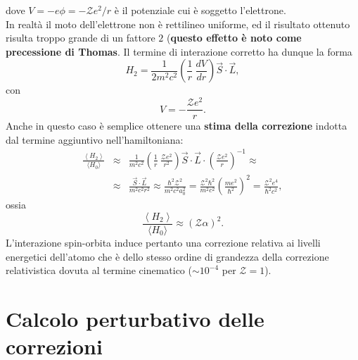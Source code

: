 \documentclass[a4paper,12pt,oneside]{book}
\begin{document}
dove $V=-e\phi=-\mathcal{Z}e^2/r$ è il potenziale cui è soggetto l'elettrone. \\
In realtà il moto dell'elettrone non è rettilineo uniforme, ed il risultato ottenuto risulta troppo grande di un fattore $2$ (\textbf{questo effetto è noto come precessione di Thomas}. Il termine di interazione corretto ha dunque la forma
\begin{equation} \label{eq:cap25_3}
H_2=\frac{1}{2m^2c^2} \left( \frac{1}{r} \ \frac{dV}{dr} \right) \vec{S} \cdot \vec{L} ,
\end{equation}
con
\begin{equation} 
V=-\frac{\mathcal{Z}e^2}{r} .
\end{equation}
Anche in questo caso è semplice ottenere una \textbf{stima della correzione} indotta dal termine aggiuntivo nell'hamiltoniana:
\begin{eqnarray}
\frac{\left< H_2 \right>}{\langle H_0 \rangle} & \approx & \frac{1}{m^2c^2} \left( \frac{1}{r} \ \frac{\mathcal{Z}e^2}{r^2} \right) \vec{S} \cdot \vec{L} \cdot \left( \frac{\mathcal{Z}e^2}{r} \right)^{-1} \approx \nonumber  \\
& \approx &\frac{\vec{S} \cdot \vec{L}}{m^2c^2r^2} \approx  \frac{\hbar^2 \mathcal{Z}^2}{m^2c^2a_0^2}=  \frac{\mathcal{Z}^2 \hbar^2}{m^2c^2}\left( \frac{me^2}{\hbar^2} \right)^2= \frac{\mathcal{Z}^2e^4}{\hbar^2c^2} ,
\end{eqnarray}
ossia
\begin{equation} 
\frac{\left< H_2 \right>}{\langle H_0 \rangle} \approx \left( \mathcal{Z}\alpha \right)^2 .
\end{equation}
L'interazione spin-orbita induce pertanto una correzione relativa ai livelli energetici dell'atomo che è dello stesso ordine di grandezza della correzione relativistica dovuta al termine cinematico ($\sim10^{-4}$ per $\mathcal{Z}=1$).
\section{Calcolo perturbativo delle correzioni}
\end{document}
